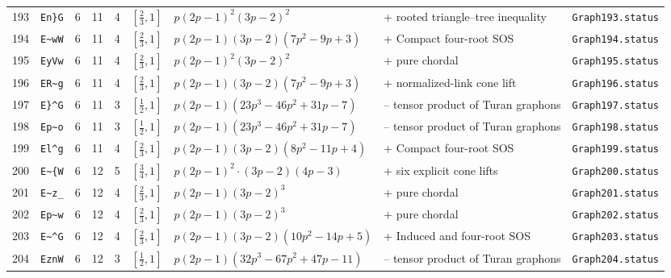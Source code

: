 \begin{landscape}
\begin{longtable}{r l r r r l p{4.0cm} p{3.5cm} p{2.7cm}}
193 & \texttt{En\}G} & 6 & 11 & 4 & $[\frac{2}{3},1]$ & $p \left(2 p - 1\right)^{2} \left(3 p - 2\right)^{2}$ & + rooted triangle--tree inequality & \texttt{Graph193.status}\\
194 & \texttt{E\textasciitilde{}wW} & 6 & 11 & 4 & $[\frac{2}{3},1]$ & $p \left(2 p - 1\right) \left(3 p - 2\right) \left(7 p^{2} - 9 p + 3\right)$ & + Compact four-root SOS & \texttt{Graph194.status}\\
195 & \texttt{EyVw} & 6 & 11 & 4 & $[\frac{2}{3},1]$ & $p \left(2 p - 1\right)^{2} \left(3 p - 2\right)^{2}$ & + pure chordal & \texttt{Graph195.status}\\
196 & \texttt{ER\textasciitilde{}g} & 6 & 11 & 4 & $[\frac{2}{3},1]$ & $p \left(2 p - 1\right) \left(3 p - 2\right) \left(7 p^{2} - 9 p + 3\right)$ & + normalized-link cone lift & \texttt{Graph196.status}\\
197 & \texttt{E\}\textasciicircum{}G} & 6 & 11 & 3 & $[\frac{1}{2},1]$ & $p \left(2 p - 1\right) \left(23 p^{3} - 46 p^{2} + 31 p - 7\right)$ & -- tensor product of Turan graphons & \texttt{Graph197.status}\\
198 & \texttt{Ep\textasciitilde{}o} & 6 & 11 & 3 & $[\frac{1}{2},1]$ & $p \left(2 p - 1\right) \left(23 p^{3} - 46 p^{2} + 31 p - 7\right)$ & -- tensor product of Turan graphons & \texttt{Graph198.status}\\
199 & \texttt{El\textasciicircum{}g} & 6 & 11 & 4 & $[\frac{2}{3},1]$ & $p \left(2 p - 1\right) \left(3 p - 2\right) \left(8 p^{2} - 11 p + 4\right)$ & + Compact four-root SOS & \texttt{Graph199.status}\\
200 & \texttt{E\textasciitilde{}\{W} & 6 & 12 & 5 & $[\frac{3}{4},1]$ & $p \left(2 p - 1\right)^{2} \cdot \left(3 p - 2\right) \left(4 p - 3\right)$ & + six explicit cone lifts & \texttt{Graph200.status}\\
201 & \texttt{E\textasciitilde{}z\_} & 6 & 12 & 4 & $[\frac{2}{3},1]$ & $p \left(2 p - 1\right) \left(3 p - 2\right)^{3}$ & + pure chordal & \texttt{Graph201.status}\\
202 & \texttt{Ep\textasciitilde{}w} & 6 & 12 & 4 & $[\frac{2}{3},1]$ & $p \left(2 p - 1\right) \left(3 p - 2\right)^{3}$ & + pure chordal & \texttt{Graph202.status}\\
203 & \texttt{E\textasciitilde{}\textasciicircum{}G} & 6 & 12 & 4 & $[\frac{2}{3},1]$ & $p \left(2 p - 1\right) \left(3 p - 2\right) \left(10 p^{2} - 14 p + 5\right)$ & + Induced and four-root SOS & \texttt{Graph203.status}\\
204 & \texttt{EznW} & 6 & 12 & 3 & $[\frac{1}{2},1]$ & $p \left(2 p - 1\right) \left(32 p^{3} - 67 p^{2} + 47 p - 11\right)$ & -- tensor product of Turan graphons & \texttt{Graph204.status}\\

\end{longtable}
\end{landscape}

